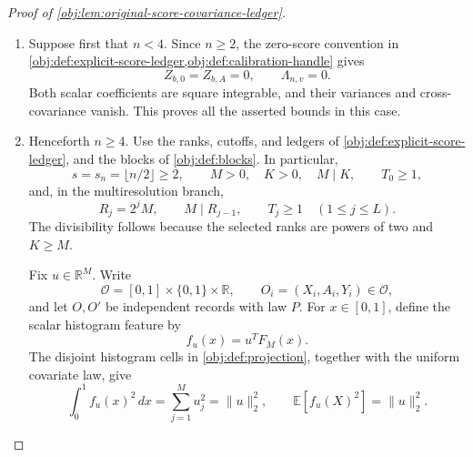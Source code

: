 \begin{proof}[Proof of \cref{obj:lem:original-score-covariance-ledger}]
\begin{enumerate}
\item Suppose first that \(n<4\). Since \(n\ge2\), the zero-score convention in \cref{obj:def:explicit-score-ledger,obj:def:calibration-handle} gives
\[
Z_{b,0}=Z_{b,A}=0,
\qquad
\Lambda_{n,v}=0.
\]
Both scalar coefficients are square integrable, and their variances and cross-covariance vanish. This proves all the asserted bounds in this case.

\item Henceforth \(n\ge4\). Use the ranks, cutoffs, and ledgers of \cref{obj:def:explicit-score-ledger}, and the blocks of \cref{obj:def:blocks}. In particular,
\[
s=s_n=\lfloor n/2\rfloor\ge2,
\qquad
M>0,\quad K>0,\quad M\mid K,
\qquad
T_0\ge1,
\]
and, in the multiresolution branch,
\[
R_j=2^jM,\qquad M\mid R_{j-1},\qquad T_j\ge1
\quad(1\le j\le L).
\]
The divisibility follows because the selected ranks are powers of two and \(K\ge M\).

Fix \(u\in\mathbb R^M\). Write
\[
\mathcal O=[0,1]\times\{0,1\}\times\mathbb R,
\qquad
O_i=(X_i,A_i,Y_i)\in\mathcal O,
\]
and let \(O,O'\) be independent records with law \(P\). For \(x\in[0,1]\), define the scalar histogram feature by
\[
f_u(x)=u^TF_M(x).
\]
The disjoint histogram cells in \cref{obj:def:projection}, together with the uniform covariate law, give
\[
\int_0^1 f_u(x)^2\,dx
=
\sum_{j=1}^{M}u_j^2
=
\|u\|_2^2,
\qquad
\mathbb E[f_u(X)^2]=\|u\|_2^2.
\]


\end{enumerate}
\end{proof}

